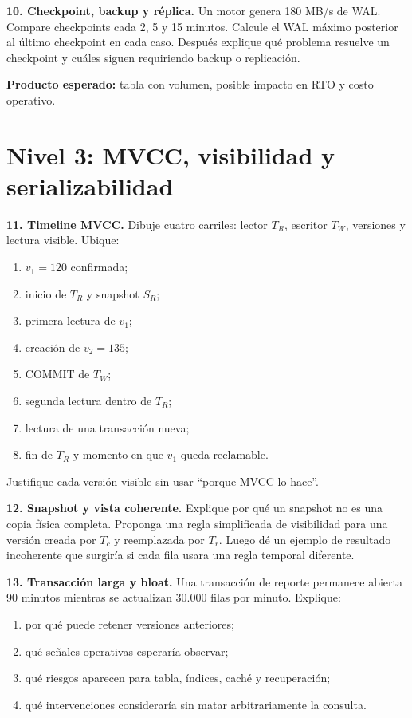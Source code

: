 \documentclass[variant=guia,cover=institutional,mode=screen]{ua-engineering-v6-article}
\begin{document}
\begin{uaexercise}
\textbf{10. Checkpoint, backup y réplica.} Un motor genera 180 MB/s de WAL. Compare checkpoints cada 2, 5 y 15 minutos. Calcule el WAL máximo posterior al último checkpoint en cada caso. Después explique qué problema resuelve un checkpoint y cuáles siguen requiriendo backup o replicación.

\textbf{Producto esperado:} tabla con volumen, posible impacto en RTO y costo operativo.
\end{uaexercise}

\section{Nivel 3: MVCC, visibilidad y serializabilidad}

\begin{uaexercise}
\textbf{11. Timeline MVCC.} Dibuje cuatro carriles: lector $T_R$, escritor $T_W$, versiones y lectura visible. Ubique:

\begin{enumerate}
\item $v_1=120$ confirmada;
\item inicio de $T_R$ y snapshot $S_R$;
\item primera lectura de $v_1$;
\item creación de $v_2=135$;
\item COMMIT de $T_W$;
\item segunda lectura dentro de $T_R$;
\item lectura de una transacción nueva;
\item fin de $T_R$ y momento en que $v_1$ queda reclamable.
\end{enumerate}

Justifique cada versión visible sin usar ``porque MVCC lo hace''.
\end{uaexercise}

\begin{uaexercise}
\textbf{12. Snapshot y vista coherente.} Explique por qué un snapshot no es una copia física completa. Proponga una regla simplificada de visibilidad para una versión creada por $T_c$ y reemplazada por $T_r$. Luego dé un ejemplo de resultado incoherente que surgiría si cada fila usara una regla temporal diferente.
\end{uaexercise}

\begin{uaexercise}
\textbf{13. Transacción larga y bloat.} Una transacción de reporte permanece abierta 90 minutos mientras se actualizan 30.000 filas por minuto. Explique:

\begin{enumerate}
\item por qué puede retener versiones anteriores;
\item qué señales operativas esperaría observar;
\item qué riesgos aparecen para tabla, índices, caché y recuperación;
\item qué intervenciones consideraría sin matar arbitrariamente la consulta.
\end{enumerate}
\end{uaexercise}
\end{document}
